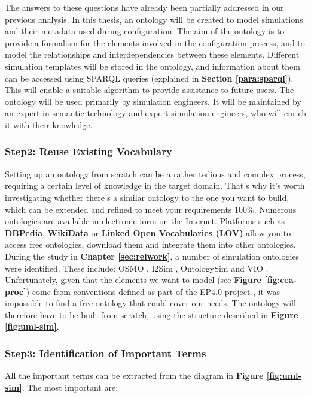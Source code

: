     The answers to these questions have already been partially addressed in our previous analysis. In this thesis, an ontology will be created to model simulations and their metadata used during configuration. The aim of the ontology is to provide a formalism for the elements involved in the configuration process, and to model the relationships and interdependencies between these elements. Different simulation templates will be stored in the ontology, and information about them can be accessed using SPARQL queries (explained in \textbf{Section \ref{para:sparql}}). This will enable a suitable algorithm to provide assistance to future users. The ontology will be used primarily by simulation engineers. It will be maintained by an expert in semantic technology and expert simulation engineers, who will enrich it with their knowledge.

    
    \subsubsection{Step2: Reuse Existing Vocabulary}
    Setting up an ontology from scratch can be a rather tedious and complex process, requiring a certain level of knowledge in the target domain. That's why it's worth investigating whether there's a similar ontology to the one you want to build, which can be extended and refined to meet your requirements 100\%. Numerous ontologies are available in electronic form on the Internet. Platforms such as \textbf{DBPedia}, \textbf{WikiData} or \textbf{Linked Open Vocabularies (LOV)} allow you to access free ontologies, download them and integrate them into other ontologies.\\
    
    During the study in \textbf{Chapter \ref{sec:relwork}}, a number of simulation ontologies were identified. These include: OSMO \cite{horsch2021osmo}, I2Sim \cite{grolinger2012ontology}, OntologySim \cite{may2022ontology} and VIO \cite{spelten2023simulation}. Unfortunately, given that the elements we want to model (see \textbf{Figure \ref{fig:cea-proc}}) come from conventions defined as part of the EP4.0 project \cite{assistSim}, it was impossible to find a free ontology that could cover our needs. The ontology will therefore have to be built from scratch, using the structure described in \textbf{Figure \ref{fig:uml-sim}}.


    \subsubsection{Step3: Identification of Important Terms}
    All the important terms can be extracted from the diagram in \textbf{Figure \ref{fig:uml-sim}}. The most important are:
    
